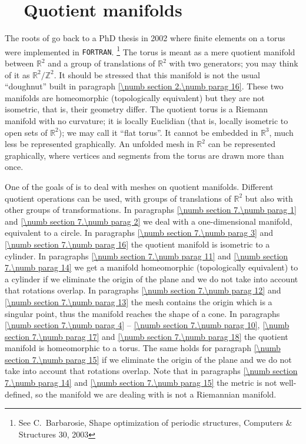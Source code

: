 
\chapter{~~Quotient manifolds}\label{\numb section 7}


The roots of {\maniFEM} go back to a PhD thesis in 2002
where finite elements on a torus were implemented in {\small\tt FORTRAN}.%
\footnote{See %
C.~Barbarosie, Shape optimization of periodic structures,
Computers \& Structures 30, 2003}
The torus is meant as a mere quotient manifold between $ \mathbb{R}^2 $ and a group of
translations of $ \mathbb{R}^2 $ with two generators;
you may think of it as $ {\mathbb R}^2/{\mathbb Z}^2 $.
It should be stressed that this manifold is not the usual ``doughnut'' built in paragraph
\ref{\numb section 2.\numb parag 16}.
These two manifolds are homeomorphic (topologically equivalent) but they are not isometric,
that is, their geometry differ.
The quotient torus is a Riemann manifold with no curvature; it is locally Euclidian
(that is, locally isometric to open sets of $ \mathbb{R}^2 $); we may call it ``flat torus''.
It cannot be embedded in $ \mathbb{R}^3 $, much less be represented graphically.
An unfolded mesh in $ \mathbb{R}^2 $ can be represented graphically, where vertices and segments
from the torus are drawn more than once.

One of the goals of {\maniFEM} is to deal with meshes on quotient manifolds.
Different quotient operations can be used, with groups of translations of $ \mathbb{R}^2 $
but also with other groups of transformations.
In paragraphs \ref{\numb section 7.\numb parag 1} and \ref{\numb section 7.\numb parag 2}
we deal with a one-dimensional manifold, equivalent to a circle.
In paragraphs \ref{\numb section 7.\numb parag 3} and \ref{\numb section 7.\numb parag 16}
the quotient manifold is isometric to a cylinder.
In paragraphs \ref{\numb section 7.\numb parag 11} and \ref{\numb section 7.\numb parag 14}
we get a manifold homeomorphic (topologically equivalent) to a cylinder
if we eliminate the origin of the plane and we do not take into account that
rotations overlap.
In paragraphs \ref{\numb section 7.\numb parag 12} and \ref{\numb section 7.\numb parag 13}
the mesh contains the origin which is a singular point, thus the manifold reaches
the shape of a cone.
In paragraphs \ref{\numb section 7.\numb parag 4} -- \ref{\numb section 7.\numb parag 10},
\ref{\numb section 7.\numb parag 17} and \ref{\numb section 7.\numb parag 18}
the quotient manifold is homeomorphic to a torus.
The same holds for paragraph \ref{\numb section 7.\numb parag 15}
if we eliminate the origin of the plane and we do not take into account that
rotations overlap.
Note that in paragraphs \ref{\numb section 7.\numb parag 14} and
\ref{\numb section 7.\numb parag 15} the metric is not well-defined,
so the manifold we are dealing with is not a Riemannian manifold.

